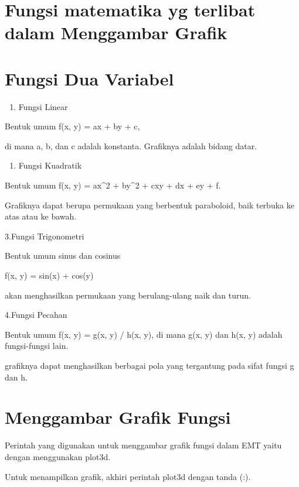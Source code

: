 \documentclass[
]{book}
\providecommand{\tightlist}{%
  \setlength{\itemsep}{0pt}\setlength{\parskip}{0pt}}
\begin{document}
\section{Fungsi matematika yg terlibat dalam Menggambar Grafik}\label{fungsi-matematika-yg-terlibat-dalam-menggambar-grafik}

\section{Fungsi Dua Variabel}\label{fungsi-dua-variabel}

\begin{enumerate}
\def\labelenumi{\arabic{enumi}.}
\tightlist
\item
  Fungsi Linear
\end{enumerate}

Bentuk umum f(x, y) = ax + by + c,

di mana a, b, dan c adalah konstanta. Grafiknya adalah bidang datar.

\begin{enumerate}
\def\labelenumi{\arabic{enumi}.}
\setcounter{enumi}{1}
\tightlist
\item
  Fungsi Kuadratik
\end{enumerate}

Bentuk umum f(x, y) = ax\^{}2 + by\^{}2 + cxy + dx + ey + f.

Grafiknya dapat berupa permukaan yang berbentuk paraboloid, baik terbuka ke atas atau ke bawah.

3.Fungsi Trigonometri

Bentuk umum sinus dan cosinus

f(x, y) = sin(x) + cos(y)

akan menghasilkan permukaan yang berulang-ulang naik dan turun.

4.Fungsi Pecahan

Bentuk umum f(x, y) = g(x, y) / h(x, y), di mana g(x, y) dan h(x, y) adalah fungsi-fungsi lain.

grafiknya dapat menghasilkan berbagai pola yang tergantung pada sifat fungsi g dan h.

\section{Menggambar Grafik Fungsi}\label{menggambar-grafik-fungsi}

Perintah yang digunakan untuk menggambar grafik fungsi dalam EMT yaitu dengan menggunakan plot3d.

Untuk menampilkan grafik, akhiri perintah plot3d dengan tanda (:).
\end{document}
